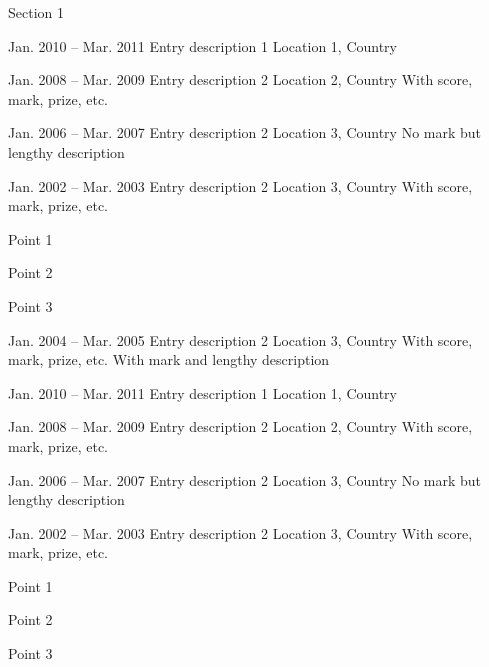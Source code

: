 
\begin{cvsection}{Section 1}%
    
    \begin{cventries}[right]

        \cventry
        {Jan. 2010 -- Mar. 2011}%
        {Entry description 1}%
        {Location 1, Country}%
        {}%
        {}%

        \cventry
        {Jan. 2008 -- Mar. 2009}%
        {Entry description 2}%
        {Location 2, Country}%
        {With score, mark, prize, etc.}%
        {}%

        \cventry
        {Jan. 2006 -- Mar. 2007}%
        {Entry description 2}%
        {Location 3, Country}%
        {}%
        {No mark but lengthy description}%

        \cventry
        {Jan. 2002 -- Mar. 2003}%
        {Entry description 2}%
        {Location 3, Country}%
        {With score, mark, prize, etc.}%
        {%
            \begin{cvitems}%
                \item Point 1
                \item Point 2
                \item Point 3
            \end{cvitems}%
        }%
        
        \cventry
        {Jan. 2004 -- Mar. 2005}%
        {Entry description 2}%
        {Location 3, Country}%
        {With score, mark, prize, etc.}%
        {With mark and lengthy description}

    \end{cventries}

    \begin{cventries}

        \cventry
        {Jan. 2010 -- Mar. 2011}%
        {Entry description 1}%
        {Location 1, Country}%
        {}%
        {}%

        \cventry
        {Jan. 2008 -- Mar. 2009}%
        {Entry description 2}%
        {Location 2, Country}%
        {With score, mark, prize, etc.}%
        {}%

        \cventry
        {Jan. 2006 -- Mar. 2007}%
        {Entry description 2}%
        {Location 3, Country}%
        {}%
        {No mark but lengthy description}%

        \cventry
        {Jan. 2002 -- Mar. 2003}%
        {Entry description 2}%
        {Location 3, Country}%
        {With score, mark, prize, etc.}%
        {%
            \begin{cvitems}%
                \item Point 1
                \item Point 2
                \item Point 3
            \end{cvitems}%
        }%
        

\end{cventries}
\end{cvsection}
